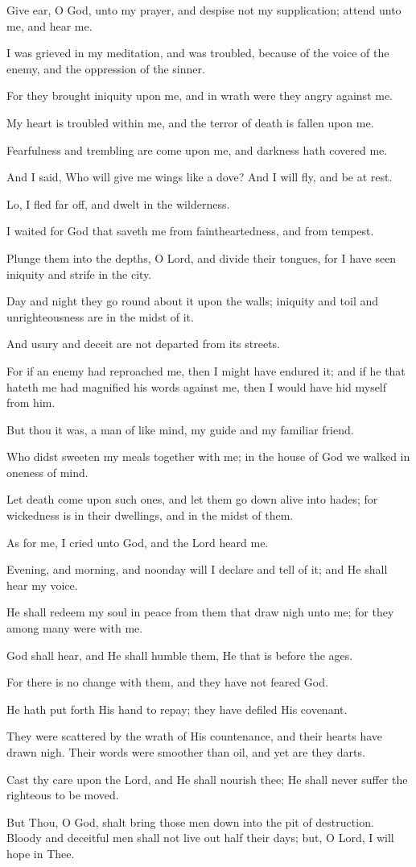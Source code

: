 Give ear, O God, unto my prayer, and despise not my supplication; attend unto me, and hear me.

I was grieved in my meditation, and was troubled, because of the voice of the enemy, and the oppression of the sinner.

For they brought iniquity upon me, and in wrath were they angry against me.

My heart is troubled within me, and the terror of death is fallen upon me.

Fearfulness and trembling are come upon me, and darkness hath covered me.

And I said, Who will give me wings like a dove? And I will fly, and be at rest.

Lo, I fled far off, and dwelt in the wilderness.

I waited for God that saveth me from faintheartedness, and from tempest.

Plunge them into the depths, O Lord, and divide their tongues, for I have seen iniquity and strife in the city.

Day and night they go round about it upon the walls; iniquity and toil and unrighteousness are in the midst of it.

And usury and deceit are not departed from its streets.

For if an enemy had reproached me, then I might have endured it; and if he that hateth me had magnified his words against me, then I would have hid myself from him.

But thou it was, a man of like mind, my guide and my familiar friend.

Who didst sweeten my meals together with me; in the house of God we walked in oneness of mind.

Let death come upon such ones, and let them go down alive into hades; for wickedness is in their dwellings, and in the midst of them.

As for me, I cried unto God, and the Lord heard me.

Evening, and morning, and noonday will I declare and tell of it; and He shall hear my voice.

He shall redeem my soul in peace from them that draw nigh unto me; for they among many were with me.

God shall hear, and He shall humble them, He that is before the ages.

For there is no change with them, and they have not feared God.

He hath put forth His hand to repay; they have defiled His covenant.

They were scattered by the wrath of His countenance, and their hearts have drawn nigh. Their words were smoother than oil, and yet are they darts.

Cast thy care upon the Lord, and He shall nourish thee; He shall never suffer the righteous to be moved.

But Thou, O God, shalt bring those men down into the pit of destruction. Bloody and deceitful men shall not live out half their days; but, O Lord, I will hope in Thee.
